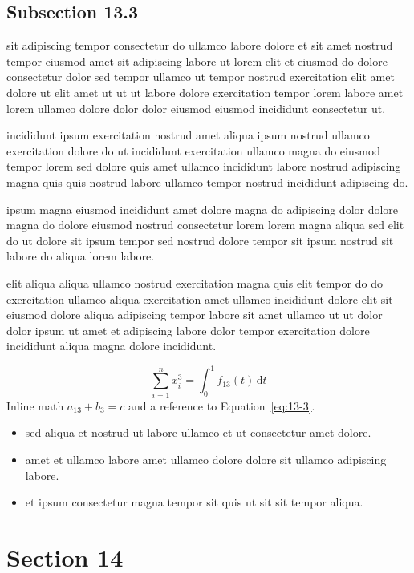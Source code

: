 \documentclass{article}
\begin{document}
\subsection{Subsection 13.3}\label{sec:13-3}
sit adipiscing tempor consectetur do ullamco labore dolore et sit amet nostrud tempor eiusmod amet sit adipiscing labore ut lorem elit et eiusmod do dolore consectetur dolor sed tempor ullamco ut tempor nostrud exercitation elit amet dolore ut elit amet ut ut ut labore dolore exercitation tempor lorem labore amet lorem ullamco dolore dolor dolor eiusmod eiusmod incididunt consectetur ut.

incididunt ipsum exercitation nostrud amet aliqua ipsum nostrud ullamco exercitation dolore do ut incididunt exercitation ullamco magna do eiusmod tempor lorem sed dolore quis amet ullamco incididunt labore nostrud adipiscing magna quis quis nostrud labore ullamco tempor nostrud incididunt adipiscing do.

ipsum magna eiusmod incididunt amet dolore magna do adipiscing dolor dolore magna do dolore eiusmod nostrud consectetur lorem lorem magna aliqua sed elit do ut dolore sit ipsum tempor sed nostrud dolore tempor sit ipsum nostrud sit labore do aliqua lorem labore.

elit aliqua aliqua ullamco nostrud exercitation magna quis elit tempor do do exercitation ullamco aliqua exercitation amet ullamco incididunt dolore elit sit eiusmod dolore aliqua adipiscing tempor labore sit amet ullamco ut ut dolor dolor ipsum ut amet et adipiscing labore dolor tempor exercitation dolore incididunt aliqua magna dolore incididunt.

\begin{equation}\label{eq:13-3}
  \sum_{i=1}^{n} x_i^{3} = \int_0^1 f_{13}(t)\,\mathrm{d}t
\end{equation}
Inline math $a_{13} + b_{3} = c$ and a reference to Equation~\eqref{eq:13-3}.

\begin{itemize}
  \item sed aliqua et nostrud ut labore ullamco et ut consectetur amet dolore.
  \item amet et ullamco labore amet ullamco dolore dolore sit ullamco adipiscing labore.
  \item et ipsum consectetur magna tempor sit quis ut sit sit tempor aliqua.
\end{itemize}

\section{Section 14}\label{sec:14}
\end{document}
